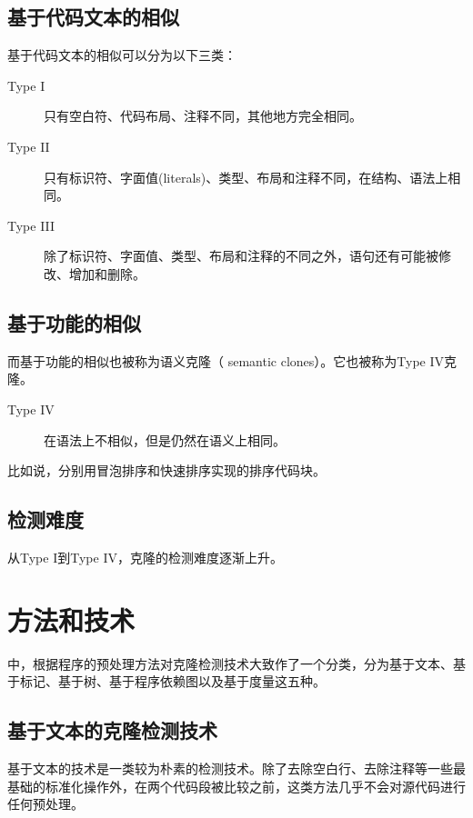 \documentclass[UTF8]{ctexart}
\begin{document}
\subsection{基于代码文本的相似}

基于代码文本的相似可以分为以下三类：

\begin{description}
	\item[Type I] 只有空白符、代码布局、注释不同，其他地方完全相同。
	\item[Type II] 只有标识符、字面值(literals)、类型、布局和注释不同，在结构、语法上相同。
	\item[Type III] 除了标识符、字面值、类型、布局和注释的不同之外，语句还有可能被修改、增加和删除。
\end{description}

\subsection{基于功能的相似}

而基于功能的相似也被称为语义克隆（ semantic clones）。它也被称为Type IV克隆。

\begin{description}
	\item[Type IV] 在语法上不相似，但是仍然在语义上相同。
\end{description}

比如说，分别用冒泡排序和快速排序实现的排序代码块。

\subsection{检测难度}

从Type I到Type IV，克隆的检测难度逐渐上升。


\section{方法和技术}
\label{sec:methods} 
\cite{Min2019}中，根据程序的预处理方法对克隆检测技术大致作了一个分类，分为基于文本、基于标记、基于树、基于程序依赖图以及基于度量这五种。

\subsection{基于文本的克隆检测技术}

基于文本的技术是一类较为朴素的检测技术。除了去除空白行、去除注释等一些最基础的标准化操作外，在两个代码段被比较之前，这类方法几乎不会对源代码进行任何预处理。
\end{document}
